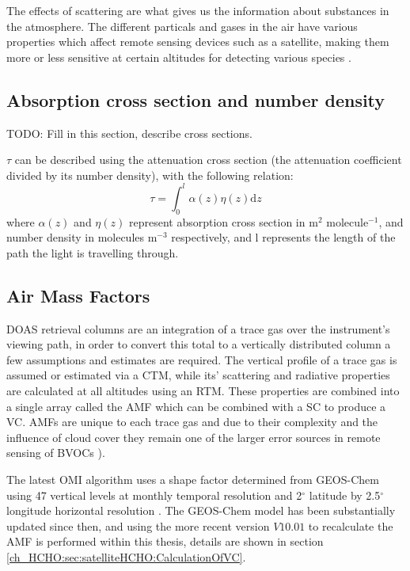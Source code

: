     The effects of scattering are what gives us the information about substances in the atmosphere.
    The different particals and gases in the air have various properties which affect remote sensing devices such as a satellite, making them more or less sensitive at certain altitudes for detecting various species \citep[e.g.]{Martin2002b}.
    
    
  \subsection{Absorption cross section and number density}
    \label{ch_HCHO:sec:satelliteHCHO:crosssection}
    TODO: Fill in this section, describe cross sections.
    
    
    $\tau$ can be described using the attenuation cross section (the attenuation coefficient divided by its number density), with the following relation:
    \begin{equation*}
      \tau = \int_0^l \alpha(z)\eta(z)\mathrm{d}z
    \end{equation*}
    where $\alpha(z)$ and $\eta(z)$ represent absorption cross section in m$^2$ molecule$^{-1}$, and number density in molecules m$^{-3}$ respectively, and l represents the length of the path the light is travelling through. 
  
  
  \subsection{Air Mass Factors}
    \label{ch_HCHO:sec:satelliteHCHO:AMFs}
    DOAS retrieval columns are an integration of a trace gas over the instrument's viewing path, in order to convert this total to a vertically distributed column a few assumptions and estimates are required. 
    The vertical profile of a trace gas is assumed or estimated via a CTM, while its' scattering and radiative properties are calculated at all altitudes using an RTM. 
    These properties are combined into a single array called the AMF which can be combined with a SC to produce a VC.
    AMFs are unique to each trace gas and due to their complexity and the influence of cloud cover they remain one of the larger error sources in remote sensing of BVOCs \citep{Palmer2001,Millet2006}).
    
    The latest OMI algorithm uses a shape factor determined from GEOS-Chem using 47 vertical levels at monthly temporal resolution and 2$^{\circ}$ latitude by 2.5$^{\circ}$ longitude horizontal resolution \citep{Abad2015}.
    The GEOS-Chem model has been substantially updated since then, and using the more recent version $V10.01$ to recalculate the AMF is performed within this thesis, details are shown in section \ref{ch_HCHO:sec:satelliteHCHO:CalculationOfVC}.
    
